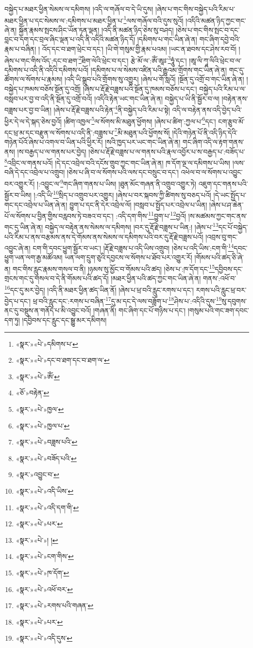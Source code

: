 བསྐྱེད་པ་མཐར་ཕྱིན་སེམས་ལ་དམིགས། །འདི་ལ་གཞོལ་བ་དེ་ཡི་དུས། །ཞེས་པ་གང་གིས་བསྐྱེད་པའི་རིམ་པ་མཐར་ཕྱིན་པ་དང་སེམས་ལ་:དམིགས་པ་མཐར་ཕྱིན་པ་\footnote{«སྣར་»«པེ་»དམིགས་པ་}ལས་གཞོལ་བའི་དུས་སུའོ། །འདིའི་མཚན་ཉིད་ཀྱང་གང་ཞེ་ན། སྐྱོན་རྣམས་སྤངས་ཤིང་ཡོན་ཏན་ལྡན། །འདི་ནི་མཚན་ཉིད་ཅེས་སུ་བཤད། །ཅེས་པ་གང་གིས་སྤང་བ་དང་བླང་བ་དག་དང་བྲལ་ཞིང་ལྡན་པ་འདི་ནི་འདིའི་མཚན་ཉིད་དོ། །དམིགས་པ་གང་ཡིན་ཞེ་ན། གང་ཞིག་དབྱེ་བའི་རྣམ་པ་བཞིན། །
འོད་དང་བ་ཐག་ཕྲེང་བ་དང་། །ཡི་གེ་གསུམ་གྱི་རྣམ་པའམ། །ཡང་ན་ཐབས་དང་ཤེས་རབ་བོ། །ཞེས་པ་གང་གིས་འོད་:དང་བ་ཐག་\footnote{«སྣར་»«པེ་»དང་བ་ཐག་དང་བ་ཐག་ལ་}ཐིག་ལེའི་ཕྲེང་བ་དང་། རྩེ་མོ་ལ་:ཨོཾ་ཨཱཿ་\footnote{«སྣར་»«པེ་»ཨོཾ་}ཧཱུཾ་དང་། །ཨཱ་ལི་ཀཱ་ལིའི་ཕྲེང་བ་ལ་དམིགས་པ་འདི་ནི་འདིའི་དམིགས་པའོ། །དམིགས་པ་ལ་སེམས་འཛིན་པའི་རྒྱུའམ་གྲོགས་གང་ཡིན་ཞེ་ན། གང་དུ་ཚོགས་ལ་སོགས་པ་རྣམས། །འདི་ཡི་སྒྲུབ་པའི་གྲོགས་སུ་འགྱུར། །ཞེས་པ་གོ་སླའོ། །སྔོན་དུ་འགྲོ་བ་གང་ཡིན་ཞེ་ན། །བསྐྱེད་པ་ཁམས་བཅོས་སྔོན་དུ་འགྲོ། །ཞེས་པ་རྡོ་རྗེ་བཟླས་པའི་སྔོན་དུ་ཁམས་བཅོས་པ་དང་། བསྐྱེད་པའི་རིམ་པ་ལ་བསླབ་པར་བྱ་བ་འདི་ནི་སྔོན་དུ་འགྲོ་བའོ། །འདིའི་རྟེན་ཡང་གང་ཡིན་ཞེ་ན། བསྐྱེད་པ་ཡི་ནི་སྦྱོར་བ་ལ། །བརྟེན་ནས་བཟླས་པར་བྱ་བ་ཡིན། །ཞེས་པ་རྡོ་རྗེ་བཟླས་པའི་རྟེན་\footnote{«ཅོ་»བརྟེན་}ནི་བསྐྱེད་པའི་རིམ་པ་སྟེ། འདི་ལ་བརྟེན་ནས་འདི་བྱེད་པའི་ཕྱིར་དེ་ལ་དེ་སྐད་ཅེས་བྱའོ། །ཚིག་འཁྱལ་\footnote{«སྣར་»«པེ་»ཁྱལ་}ལ་སོགས་མི་མཐུན་ཕྱོགས། །ཞེས་པ་ཚིག་:ཀྱལ་པ་\footnote{«སྣར་»«པེ་»ཁྱལ་པ་}དང་། ངག་རྩུབ་མོ་དང་ཕྲ་མ་དང་བརྫུན་ལ་སོགས་པ་འདི་ནི་:བཟླས་པ་\footnote{«སྣར་»«པེ་»བཟླས་པའི་}མི་མཐུན་པའི་ཕྱོགས་སོ། །དེའི་གཉེན་པོ་ནི་འདི་ཉིད་དེའི་གཉེན་པོའོ་ཞེས་པ་འགལ་བ་ཡིན་པའི་ཕྱིར་རོ། །སའི་ཁྱད་པར་ཡང་གང་ཡིན་ཞེ་ན། གང་ཞིག་འདི་ལ་རྟག་གནས་ནས། །ས་བརྒྱད་པ་ལ་གནས་པར་བྱེད། །ཅེས་པ་རྡོ་རྗེ་བཟླས་པ་ལ་གནས་པའི་རྣལ་འབྱོར་པ་ས་བརྒྱད་པ་:བཟོད་པ་\footnote{«སྣར་»«པེ་»བཟོད་པའི་}འབྲིང་ལ་གནས་པའོ། །དེ་དང་འབྲེལ་བའི་དངོས་གྲུབ་ཀྱང་གང་ཡིན་ཞེ་ན། ཁ་དོག་ལྔ་ལ་དམིགས་པ་ཡིས། །ལས་བཞི་དེ་དང་འབྲེལ་པ་འགྲུབ། །ཅེས་པ་ཞི་བ་ལ་སོགས་པའི་ལས་དང་བསྲུང་བ་དང་། འཕེལ་བ་ལ་སོགས་པ་འབྱུང་བར་འགྱུར་རོ། །:འབྱུང་ལ་\footnote{«སྣར་»འབྱུང་བ་}གང་ཞིག་གནས་པ་ཡིས། །ཐུན་མོང་གཞན་ནི་འགྲུབ་འགྱུར་ཏེ། འཇུག་དང་གནས་པའི་སྦྱོར་བ་ཡིས། །:འདི་ཡི་\footnote{«སྣར་»«པེ་»འདི་ཡིས་}སྲིད་པ་འགྲུབ་པར་འགྱུར། །ཞེས་པ་བར་སྐབས་ཀྱི་ཚིགས་སུ་བཅད་པའོ། །དེ་ཡང་སྤྱོད་པ་གང་དང་འབྲེལ་པ་ཡིན་ཞེ་ན། བྱུག་པ་དང་ནི་དེར་འབྲེལ་ལོ། །བསླབ་པ་སྤྱོད་པར་འབྲེལ་པ་ཡིན། །ཞེས་པ་ཤ་ཆེན་པོ་ལ་སོགས་པ་བྱིན་གྱིས་བརླབས་ཏེ་བཟའ་བ་དང་། :འདི་དག་གིས་\footnote{«སྣར་»«པེ་»འདི་དག་གི་}བྱུག་པ་\footnote{«སྣར་»«པེ་»པར་}བྱའོ། །ས་མཚམས་ཀྱང་གང་ནས་གང་དུ་ཡིན་ཞེ་ན། བསྐྱེད་ལ་བརྟེན་ནས་སེམས་ལ་དམིགས། །བར་དུ་རྡོ་རྗེ་བཟླས་པ་ཡིན:། །ཞེས་པ་\footnote{«སྣར་»«པེ་»། །}དང་པོ་བསྐྱེད་པའི་རིམ་པ་ནས་བརྩམས་ནས་དེ་གོམས་ནས་སེམས་ལ་དམིགས་པའི་བར་དུ་རྡོ་རྗེ་བཟླས་པའོ། །འབྲས་བུ་གང་འབྱུང་ཞེ་ན། ངག་གི་དབང་ཕྱུག་སྦྱོར་བ་ཡང་། །རྡོ་རྗེ་བཟླས་པ་འདི་ཡིས་འགྲུབ། །ཅེས་པ་འདི་ཡིས་:ངག་གི་\footnote{«སྣར་»«པེ་»ངག་གིས་}དབང་ཕྱུག་ཡན་ལག་རྒྱ་མཚོའམ། ཡན་ལག་དྲུག་ཅུའི་དབྱངས་ལ་སོགས་པ་ཐོབ་པར་འགྱུར་རོ། །གོམས་པའི་ཚད་ཅི་ཞེ་ན། གང་གིས་རླུང་རྣམས་གསལ་བ་ནི། །ཉམས་སུ་མྱོང་བ་གོམས་པའི་ཚད། །ཅེས་པ་:ཁ་དོག་དང་\footnote{«སྣར་»«པེ་»ཁ་དོག་}དབྱིབས་དང་གྲངས་གང་དུ་གསལ་བ་དེ་ནི་གོམས་པའི་ཚད་དོ། །མཐར་ཕྱིན་པའི་ཚད་ཀྱང་གང་ཡིན་ཞེ་ན། གནས་:འཕོ་བ་\footnote{«སྣར་»«པེ་»འཕོ་བར་}དང་དུ་མར་བྱེད། །འདི་ནི་མཐར་ཕྱིན་ཚད་ཡིན་ནོ། །ཞེས་པ་ཕྲ་བའི་རླུང་རགས་པ་དང་། རགས་པའི་རླུང་ཕྲ་བར་བྱེད་པ་དང་། ཕྲ་བའི་རླུང་དང་:རགས་པ་བཞིན་\footnote{«སྣར་»«པེ་»རགས་པའི་གཞན་}དུ་མ་དང་དེ་ལས་བཟློག་པ་\footnote{«སྣར་»«པེ་»པར་}ཤེས་པ་:འདིའི་དུས་\footnote{«སྣར་»«པེ་»འདི་དུས་}སུ་དབུགས་ནང་དུ་བསྡུས་ན་གནོད་པ་མི་འབྱུང་བའོ། །གཞན་ནི། གང་ཞིག་དང་པོ་གཉིས་པ་དང་། །གསུམ་པའི་གང་ཟག་དབང་དག་ཏུ། །དབྱིབས་དང་རླུང་དང་སྒྱུ་མར་དམིགས། 